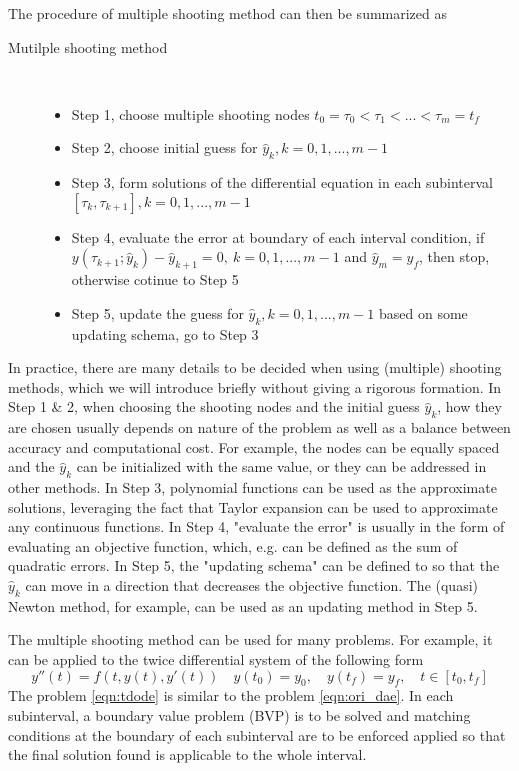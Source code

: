 \documentclass  [
  paper    = a4,
  BCOR     = 10mm,
  twoside,
  fontsize = 12pt,
  fleqn,
  toc      = bibnumbered,
  toc      = listofnumbered,
  numbers  = noendperiod,
  headings = normal,
  listof   = leveldown,
  version  = 3.03
]                                       {scrreprt}
\newcommand{\<}{\langle}
\renewcommand{\>}{\rangle}
\begin{document}
   The procedure of multiple shooting method can then be summarized as
   \begin{description}
   	\item[Mutilple shooting method] \
   	\begin{itemize}
   		\item Step 1, choose multiple shooting nodes $t_0 = \tau_0 < \tau_1 < ... < \tau_m = t_f$ 
   		\item Step 2, choose initial guess for $\hat{y}_k, k = 0, 1, ..., m-1$ 
   		\item Step 3, form solutions of the differential equation in each subinterval $[\tau_k, \tau_{k+1}], k = 0, 1, ..., m-1$
   		\item Step 4, evaluate the error at boundary of each interval condition, if $y(\tau_{k+1}; \hat{y}_k) - \hat{y}_{k+1} = 0, \  k = 0, 1, ..., m-1$ and $\hat{y}_{m} = y_f$, then stop, otherwise cotinue to Step 5
   		\item Step 5, update the guess for $\hat{y}_k, k = 0, 1, ..., m-1$ based on some updating schema, go to Step 3
   	\end{itemize}
   \end{description}
   
   In practice, there are many details to be decided when using (multiple) shooting methods, which we will introduce briefly without giving a rigorous formation. In Step 1 \& 2, when choosing the shooting nodes and the initial guess $\hat{y}_k$, how they are chosen usually depends on nature of the problem as well as a balance between accuracy and computational cost. For example, the nodes can be equally spaced and the $\hat{y}_k$ can be initialized with the same value, or they can be addressed in other methods. In Step 3, polynomial functions can be used as the approximate solutions, leveraging the fact that Taylor expansion can be used to approximate any continuous functions. In Step 4, "evaluate the error" is usually in the form of evaluating an objective function, which, e.g. can be defined as the sum of quadratic errors. In Step 5, the "updating schema" can be defined to so that the $\hat{y}_k$ can move in a direction that decreases the objective function. The (quasi) Newton method, for example, can be used as an updating method in Step 5. 
   
   
   The multiple shooting method can be used for many problems. For example, it can be applied to the twice differential system of the following form 
   \begin{equation}
   y''(t) = f(t, y(t), y'(t))  \quad y(t_0) = y_0, \quad y(t_f) = y_f,  \quad t \in [t_0, t_f]
   \label{eqn:tdode}
   \end{equation}
   The problem \ref{eqn:tdode} is similar to the problem \ref{eqn:ori_dae}. In each subinterval, a boundary value problem (BVP) is to be solved and matching conditions at the boundary of each subinterval are to be enforced applied so that the final solution found is applicable to the whole interval. 
   
\end{document}
